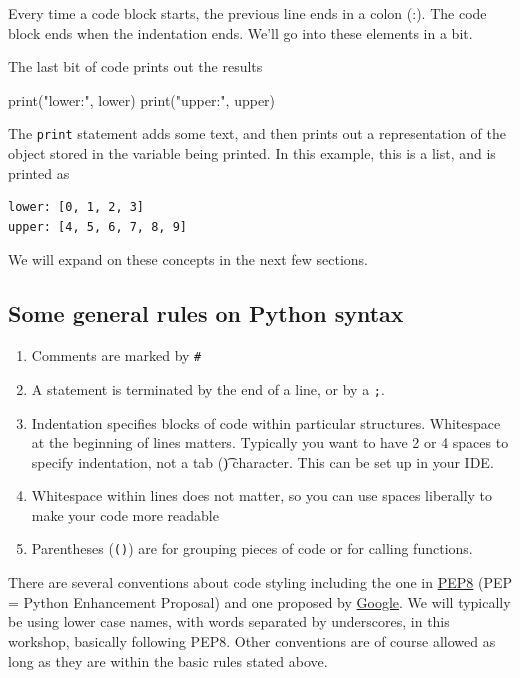 \documentclass[
  letterpaper,
]{scrbook}
\newenvironment{Shaded}{\begin{snugshade}}{\end{snugshade}}
\newcommand{\BuiltInTok}[1]{#1}
\newcommand{\NormalTok}[1]{#1}
\newcommand{\StringTok}[1]{\textcolor[rgb]{0.31,0.60,0.02}{#1}}
\providecommand{\tightlist}{%
  \setlength{\itemsep}{0pt}\setlength{\parskip}{0pt}}
\begin{document}
Every time a code block starts, the previous line ends in a colon (:). The code block ends when the indentation ends. We'll go into these elements in a bit.

The last bit of code prints out the results

\begin{Shaded}
\begin{Highlighting}[]
\BuiltInTok{print}\NormalTok{(}\StringTok{"lower:"}\NormalTok{, lower)}
\BuiltInTok{print}\NormalTok{(}\StringTok{"upper:"}\NormalTok{, upper)}
\end{Highlighting}
\end{Shaded}

The \texttt{print} statement adds some text, and then prints out a representation of the object stored in the variable being printed. In this example, this is a list, and is printed as

\begin{verbatim}
lower: [0, 1, 2, 3]
upper: [4, 5, 6, 7, 8, 9]
\end{verbatim}

We will expand on these concepts in the next few sections.

\hypertarget{some-general-rules-on-python-syntax}{%
\subsection{Some general rules on Python syntax}\label{some-general-rules-on-python-syntax}}

\begin{enumerate}
\def\labelenumi{\arabic{enumi}.}
\tightlist
\item
  Comments are marked by \texttt{\#}
\item
  A statement is terminated by the end of a line, or by a \texttt{;}.
\item
  Indentation specifies blocks of code within particular structures. Whitespace at the beginning of lines matters. Typically you want to have 2 or 4 spaces to specify indentation, not a tab (\t) character. This can be set up in your IDE.
\item
  Whitespace within lines does not matter, so you can use spaces liberally to make your code more readable
\item
  Parentheses (\texttt{()}) are for grouping pieces of code or for calling functions.
\end{enumerate}

There are several conventions about code styling including the one in \href{https://www.python.org/dev/peps/pep-0008/\#function-and-variable-names}{PEP8} (PEP = Python Enhancement Proposal) and one proposed by \href{https://google.github.io/styleguide/pyguide.html\#316-naming}{Google}. We will typically be using lower case names, with words separated by underscores, in this workshop, basically following PEP8. Other conventions are of course allowed as long as they are within the basic rules stated above.
\end{document}
